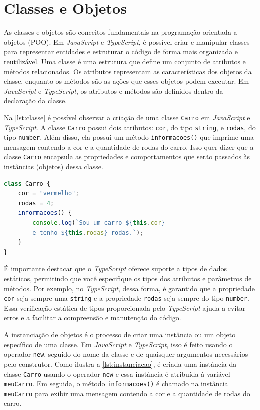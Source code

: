 \section{Classes e Objetos}
\label{JS_classesObjetos}

As classes e objetos são conceitos fundamentais na programação orientada a objetos (POO). Em \textit{JavaScript} e \textit{TypeScript}, é possível criar e manipular classes para representar entidades e estruturar o código de forma mais organizada e reutilizável. Uma classe é uma estrutura que define um conjunto de atributos e métodos relacionados. Os atributos representam as características dos objetos da classe, enquanto os métodos são as ações que esses objetos podem executar. Em \textit{JavaScript} e \textit{TypeScript}, os atributos e métodos são definidos dentro da declaração da classe.

Na \autoref{lst:classe} é possível observar a criação de uma classe \texttt{Carro} em \textit{JavaScript} e \textit{TypeScript}. A classe \texttt{Carro} possui dois atributos: \texttt{cor}, do tipo \texttt{string}, e \texttt{rodas}, do tipo \texttt{number}. Além disso, ela possui um método \texttt{informacoes()} que imprime uma mensagem contendo a cor e a quantidade de rodas do carro. Isso quer dizer que a classe \texttt{Carro} encapsula as propriedades e comportamentos que serão passados às instâncias (objetos) dessa classe.

\Needspace{0.3\textheight}
\begin{lstlisting}[language=TypeScript, caption=Exemplo básico de classe em JS e TS., label=lst:classe]
class Carro {
    cor = "vermelho";
    rodas = 4;
    informacoes() {
        console.log(`Sou um carro ${this.cor}
        e tenho ${this.rodas} rodas.`);
    }
}
\end{lstlisting}

É importante destacar que o \textit{TypeScript} oferece suporte a tipos de dados estáticos, permitindo que você especifique os tipos dos atributos e parâmetros de métodos. Por exemplo, no \textit{TypeScript}, dessa forma, é garantido que a propriedade \texttt{cor} seja sempre uma \texttt{string} e a propriedade \texttt{rodas} seja sempre do tipo \texttt{number}. Essa verificação estática de tipos proporcionada pelo \textit{TypeScript} ajuda a evitar erros e a facilitar a compreensão e manutenção do código.

A instanciação de objetos é o processo de criar uma instância ou um objeto específico de uma classe. Em \textit{JavaScript} e \textit{TypeScript}, isso é feito usando o operador \texttt{new}, seguido do nome da classe e de quaisquer argumentos necessários pelo construtor. Como ilustra a \autoref{lst:instanciacao}, é criada uma instância da classe \texttt{Carro} usando o operador \texttt{new} e essa instância é atribuída à variável \texttt{meuCarro}. Em seguida, o método \texttt{informacoes()} é chamado na instância \texttt{meuCarro} para exibir uma mensagem contendo a cor e a quantidade de rodas do carro.

